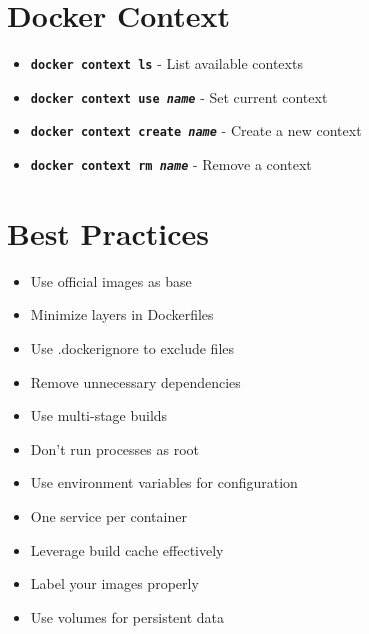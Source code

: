 \documentclass[10pt]{article}
\newcommand{\cmd}[1]{\texttt{#1}}
\newcommand{\dockitem}[2]{\item \textbf{\cmd{#1}} - #2}
\begin{document}
\begin{multicols}{2}
\section{Docker Context}
\begin{itemize}[leftmargin=*,noitemsep]
\dockitem{docker context ls}{List available contexts}
\dockitem{docker context use \textit{name}}{Set current context}
\dockitem{docker context create \textit{name}}{Create a new context}
\dockitem{docker context rm \textit{name}}{Remove a context}
\end{itemize}

\vfill
\columnbreak

\section{Best Practices}
\begin{itemize}[leftmargin=*,noitemsep]
\item Use official images as base
\item Minimize layers in Dockerfiles
\item Use .dockerignore to exclude files
\item Remove unnecessary dependencies
\item Use multi-stage builds
\item Don't run processes as root
\item Use environment variables for configuration
\item One service per container
\item Leverage build cache effectively
\item Label your images properly
\item Use volumes for persistent data
\end{itemize}

\end{multicols}
\end{document}

